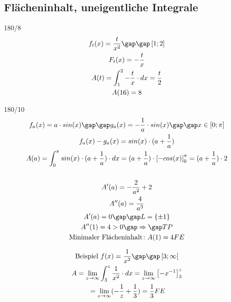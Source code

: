 \subsection{Flächeninhalt, uneigentliche Integrale}
\begin{exercise}{180/8}
  \begin{gather*}
    f_t(x) = \frac{t}{x^2} \gap\gap \left[1; 2\right] \\
    F_t(x) = -\frac{t}{x} \\
    A(t) = \int_1^2 -\frac{t}{x} \cdot dx = \frac{t}{2} \\
    A(16) = 8
  \end{gather*}
\end{exercise}
\begin{exercise}{180/10}
  \begin{gather*}
    f_a(x) = a \cdot sin(x) \gap\gap g_a(x) = -\frac{1}{a} \cdot sin(x) \gap\gap x \in \left[0; \pi\right] \\
    f_a(x) - g_a(x) = sin(x) \cdot (a + \frac{1}{a}) \\
    A(a) = \int_0^\pi sin(x) \cdot (a + \frac{1}{a}) \cdot dx = (a + \frac{1}{a}) \cdot \left[-cos(x)\right]_0^\pi = (a + \frac{1}{a}) \cdot 2 \\\\
    A'(a) = -\frac{2}{a^2} + 2 \\
    A''(a) = \frac{4}{a^3} \\
    A'(a) = 0 \gap\gap L = \{\pm1\} \\
    A''(1) = 4 > 0 \gap\Rightarrow\gap TP \\
    \text{Minimaler Flächeninhalt} \colon A(1) = 4FE
  \end{gather*}
\end{exercise}
\begin{gather*}
  \text{Beispiel } f(x) = \frac{1}{x^2} \gap\gap \left[3; \infty\right[ \\
  A = \lim\limits_{z \to \infty} \int_3^z \frac{1}{x^2} \cdot dx = \lim\limits_{z \to \infty} \left[-x^{-1}\right]_3^z \\
  \;= \lim\limits_{z \to \infty} (-\frac{1}{z} + \frac{1}{3}) = \frac{1}{3}FE
\end{gather*}
